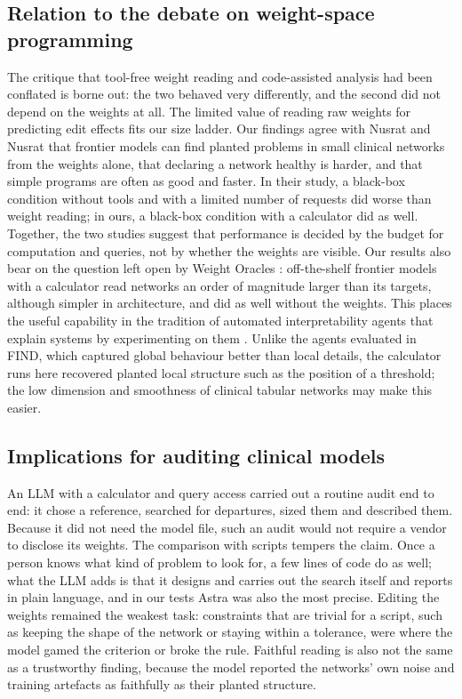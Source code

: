 \documentclass[11pt]{article}
\begin{document}
\subsection{Relation to the debate on weight-space programming}

The critique that tool-free weight reading and code-assisted analysis had been conflated \cite{honnibal2026} is borne out: the two behaved very differently, and the second did not depend on the weights at all. The limited value of reading raw weights for predicting edit effects \cite{singh2026} fits our size ladder. Our findings agree with Nusrat and Nusrat \cite{nusrat2026} that frontier models can find planted problems in small clinical networks from the weights alone, that declaring a network healthy is harder, and that simple programs are often as good and faster. In their study, a black-box condition without tools and with a limited number of requests did worse than weight reading; in ours, a black-box condition with a calculator did as well. Together, the two studies suggest that performance is decided by the budget for computation and queries, not by whether the weights are visible. Our results also bear on the question left open by Weight Oracles \cite{kabra2026}: off-the-shelf frontier models with a calculator read networks an order of magnitude larger than its targets, although simpler in architecture, and did as well without the weights. This places the useful capability in the tradition of automated interpretability agents that explain systems by experimenting on them \cite{schwettmann2023,shaham2024}. Unlike the agents evaluated in FIND, which captured global behaviour better than local details, the calculator runs here recovered planted local structure such as the position of a threshold; the low dimension and smoothness of clinical tabular networks may make this easier.

\subsection{Implications for auditing clinical models}

An LLM with a calculator and query access carried out a routine audit end to end: it chose a reference, searched for departures, sized them and described them. Because it did not need the model file, such an audit would not require a vendor to disclose its weights. The comparison with scripts tempers the claim. Once a person knows what kind of problem to look for, a few lines of code do as well; what the LLM adds is that it designs and carries out the search itself and reports in plain language, and in our tests Astra was also the most precise. Editing the weights remained the weakest task: constraints that are trivial for a script, such as keeping the shape of the network or staying within a tolerance, were where the model gamed the criterion or broke the rule. Faithful reading is also not the same as a trustworthy finding, because the model reported the networks' own noise and training artefacts as faithfully as their planted structure.
\end{document}
